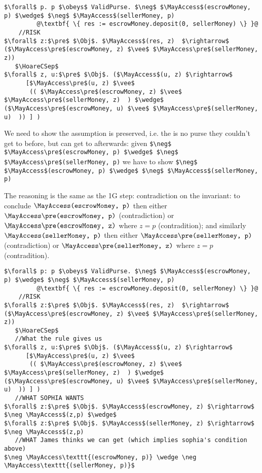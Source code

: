 \begin{lstlisting}[escapechar=@]
$\forall$ p. p $\obeys$ ValidPurse. $\neg$ $\MayAccess$(escrowMoney, p) $\wedge$ $\neg$ $\MayAccess$(sellerMoney, p)
         @\textbf{ \{ res := escrowMoney.deposit(0, sellerMoney) \} }@
    //RISK
$\forall$ z:$\pre$ $\Obj$. $\MayAccess$(res, z)  $\rightarrow$ ($\MayAccess\pre$(escrowMoney, z) $\vee$ $\MayAccess\pre$(sellerMoney, z))
   $\HoareCSep$
$\forall$ z, u:$\pre$ $\Obj$. ($\MayAccess$(u, z) $\rightarrow$
      [$\MayAccess\pre$(u, z) $\vee$
       (( $\MayAccess\pre$(escrowMoney, z) $\vee$ $\MayAccess\pre$(sellerMoney, z)  ) $\wedge$ ($\MayAccess\pre$(escrowMoney, u) $\vee$ $\MayAccess\pre$(sellerMoney, u)  )) ] )
\end{lstlisting}

We need to show the assumption is preserved, i.e. the is no purse they couldn't get to before, but can get to afterwards: given
%
\lstinline+$\neg$ $\MayAccess\pre$(escrowMoney, p) $\wedge$ $\neg$ $\MayAccess\pre$(sellerMoney, p)+
%
we have to show
%
\lstinline+$\neg$ $\MayAccess$(escrowMoney, p) $\wedge$ $\neg$ $\MayAccess$(sellerMoney, p)+


The reasoning is the same as the 1G step: contradiction on the invariant: to conclude
$\MayAccess\texttt{(escrowMoney, p)}$  then either
$\MayAccess\pre\texttt{(escrowMoney, p)}$  (contradiction) or
$\MayAccess\pre\texttt{(escrowMoney, z)}$ where $z = p$ (contradition);
and similarly
$\MayAccess\texttt{(sellerMoney, p)}$  then either
$\MayAccess\pre\texttt{(sellerMoney, p)}$  (contradiction) or
$\MayAccess\pre\texttt{(sellerMoney, z)}$ where $z = p$ (contradition).

\begin{lstlisting}[escapechar=@]
$\forall$ p: p $\obeys$ ValidPurse. $\neg$ $\MayAccess$(escrowMoney, p) $\wedge$ $\neg$ $\MayAccess$(sellerMoney, p)
         @\textbf{ \{ res := escrowMoney.deposit(0, sellerMoney) \} }@
    //RISK
$\forall$ z:$\pre$ $\Obj$. $\MayAccess$(res, z)  $\rightarrow$ ($\MayAccess\pre$(escrowMoney, z) $\vee$ $\MayAccess\pre$(sellerMoney, z))
   $\HoareCSep$
   //What the rule gives us
$\forall$ z, u:$\pre$ $\Obj$. ($\MayAccess$(u, z) $\rightarrow$
      [$\MayAccess\pre$(u, z) $\vee$
       (( $\MayAccess\pre$(escrowMoney, z) $\vee$ $\MayAccess\pre$(sellerMoney, z)  ) $\wedge$ ($\MayAccess\pre$(escrowMoney, u) $\vee$ $\MayAccess\pre$(sellerMoney, u)  )) ] )
   //WHAT SOPHIA WANTS
$\forall$ z:$\pre$ $\Obj$. $\MayAccess$(escrowMoney, z) $\rightarrow$ $\neg \MayAccess$(z,p) $\wedge$
$\forall$ z:$\pre$ $\Obj$. $\MayAccess$(sellerMoney, z) $\rightarrow$ $\neg \MayAccess$(z,p)
   //WHAT James thinks we can get (which implies sophia's condition above)
$\neg \MayAccess\texttt{(escrowMoney, p)} \wedge \neg \MayAccess\texttt{(sellerMoney, p)}$
\end{lstlisting}



